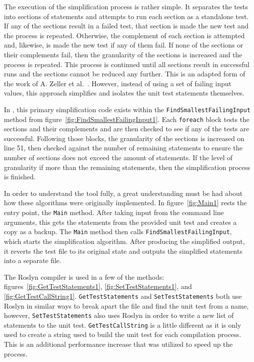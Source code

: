 The execution of the simplification process is rather simple. It separates the tests into sections of statements and attempts to run each section as a standalone test. If any of the sections result in a failed test, that section is made the new test and the process is repeated. Otherwise, the complement of each section is attempted and, likewise, is made the new test if any of them fail. If none of the sections or their complements fail, then the granularity of the sections is increased and the process is repeated. This process is continued until all sections result in successful runs and the sections cannot be reduced any further. This is an adapted form of the work of A. Zeller et al.~\cite{zeller2002simplifying}. However, instead of using a set of failing input values, this approach simplifies and isolates the unit test statements themselves.

In \mytool, this primary simplification code exists within the \texttt{FindSmallestFailingInput} method from figure~\ref{fig:FindSmallestFailingInput1}. Each \texttt{foreach} block tests the sections and their complements and are then checked to see if any of the tests are successful. Following those blocks, the granularity of the sections is increased on line 51, then checked against the number of remaining statements to ensure the number of sections does not exceed the amount of statements. If the level of granularity if more than the remaining statements, then the simplification process is finished.

In order to understand the tool fully, a great understanding must be had about how these algorithms were originally implemented. In figure~\ref{fig:Main1} rests the \mytool entry point, the \texttt{Main} method. After taking input from the command line arguments, this gets the statements from the provided unit test and creates a copy as a backup. The \texttt{Main} method then calls \texttt{FindSmallestFailingInput}, which starts the simplification algorithm. After producing the simplified output, it reverts the test file to its original state and outputs the simplified statements into a separate file.

The Roslyn compiler is used in a few of the methods: figures~\ref{fig:GetTestStatements1}, \ref{fig:SetTestStatements1}, and \ref{fig:GetTestCallString1}. \texttt{GetTestStatements} and \texttt{SetTestStatements} both use Roslyn in similar ways to break apart the file and find the unit test from a name, however, \texttt{SetTestStatements} also uses Roslyn in order to write a new list of statements to the unit test. \texttt{GetTestCallString} is a little different as it is only used to create a string used to build the unit test for each compilation process. This is an additional performance increase that was utilized to speed up the process.

